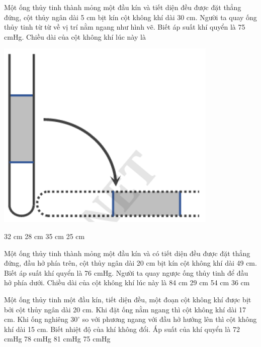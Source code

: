 \documentclass[12pt,a4paper]{article}
\begin{document}
\begin{multicols}{2}
	\begin{ex}
		Một ống thủy tinh thành mỏng một đầu kín và tiết diện đều được đặt thẳng đứng, cột thủy ngân dài 5 cm bịt kín cột không khí dài 30 cm. Người ta quay ống thủy tinh từ từ về vị trí nằm ngang như hình vẽ. Biết áp suất khí quyển là 75 cmHg. Chiều dài của cột không khí lúc này là
			\begin{center}
			\includegraphics[scale=0.3]{img/6.png}
		\end{center}
		\choice
		{32 cm}
		{28 cm}
		{35 cm}
		{25 cm}
	\end{ex}
	
	\begin{ex}
		Một ống thủy tinh thành mỏng một đầu kín và có tiết diện đều được đặt thẳng đứng, đầu hở phía trên, cột thủy ngân dài 20 cm bịt kín cột không khí dài 49 cm. Biết áp suất khí quyển là 76 cmHg. Người ta quay ngược ống thủy tinh để đầu hở phía dưới. Chiều dài của cột không khí lúc này là
		\choice
		{84 cm}
		{29 cm}
		{54 cm}
		{36 cm}
	\end{ex}
	
	\begin{ex}
		Một ống thủy tinh một đầu kín, tiết diện đều, một đoạn cột không khí được bịt bởi cột thủy ngân dài 20 cm. Khi đặt ống nằm ngang thì cột không khí dài 17 cm. Khi ống nghiêng $30^\circ$ so với phương ngang với đầu hở hướng lên thì cột không khí dài 15 cm. Biết nhiệt độ của khí không đổi. Áp suất của khí quyển là
		\choice
		{72 cmHg}
		{78 cmHg}
		{81 cmHg}
		{75 cmHg}
	\end{ex}
	

\end{multicols}
\end{document}
